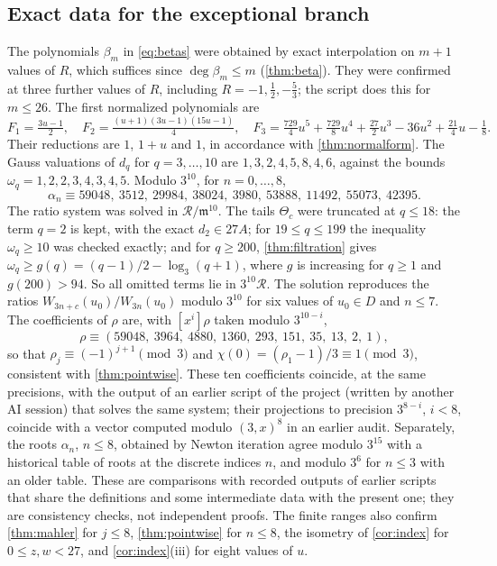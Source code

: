 \documentclass[11pt,reqno]{amsart}
\theoremstyle{definition}
\theoremstyle{remark}
\theoremstyle{plain}
\newcommand{\RR}{\mathscr R}
\newcommand{\mm}{\mathfrak m}
\begin{document}
\subsection{Exact data for the exceptional branch}
The polynomials $\beta_m$ in \eqref{eq:betas} were obtained by exact interpolation on $m+1$ values of $R$, which suffices since $\deg\beta_m\le m$ (\cref{thm:beta}). They were confirmed at three further values of $R$, including $R=-1,\tfrac12,-\tfrac53$; the script does this for $m\le26$. The first normalized polynomials are
\[
F_1=\tfrac{3u-1}2,\quad F_2=\tfrac{(u+1)(3u-1)(15u-1)}4,\quad F_3=\tfrac{729}{4}u^5+\tfrac{729}{8}u^4+\tfrac{27}{2}u^3-36u^2+\tfrac{21}4u-\tfrac18 .
\]
Their reductions are $1$, $1+u$ and $1$, in accordance with \cref{thm:normalform}. The Gauss valuations of $d_q$ for $q=3,\dots,10$ are $1,3,2,4,5,8,4,6$, against the bounds $\omega_q=1,2,2,3,4,3,4,5$. Modulo $3^{10}$, for $n=0,\dots,8$,
\[
\alpha_n\equiv59048,\ 3512,\ 29984,\ 38024,\ 3980,\ 53888,\ 11492,\ 55073,\ 42395 .
\]
The ratio system was solved in $\RR/\mm^{10}$. The tails $\Theta_c$ were truncated at $q\le18$: the term $q=2$ is kept, with the exact $d_2\in27A$; for $19\le q\le199$ the inequality $\omega_q\ge10$ was checked exactly; and for $q\ge200$, \cref{thm:filtration} gives $\omega_q\ge g(q)=(q-1)/2-\log_3(q+1)$, where $g$ is increasing for $q\ge1$ and $g(200)>94$. So all omitted terms lie in $3^{10}\RR$. The solution reproduces the ratios $W_{3n+c}(u_0)/W_{3n}(u_0)$ modulo $3^{10}$ for six values of $u_0\in D$ and $n\le7$. The coefficients of $\rho$ are, with $[x^i]\rho$ taken modulo $3^{10-i}$,
\[
\rho\equiv(59048,\ 3964,\ 4880,\ 1360,\ 293,\ 151,\ 35,\ 13,\ 2,\ 1),
\]
so that $\rho_j\equiv(-1)^{j+1}\pmod3$ and $\chi(0)=(\rho_1-1)/3\equiv1\pmod 3$, consistent with \cref{thm:pointwise}. These ten coefficients coincide, at the same precisions, with the output of an earlier script of the project (written by another AI session) that solves the same system; their projections to precision $3^{8-i}$, $i<8$, coincide with a vector computed modulo $(3,x)^8$ in an earlier audit. Separately, the roots $\alpha_n$, $n\le8$, obtained by Newton iteration agree modulo $3^{15}$ with a historical table of roots at the discrete indices $n$, and modulo $3^6$ for $n\le3$ with an older table. These are comparisons with recorded outputs of earlier scripts that share the definitions and some intermediate data with the present one; they are consistency checks, not independent proofs. The finite ranges also confirm \cref{thm:mahler} for $j\le8$, \cref{thm:pointwise} for $n\le8$, the isometry of \cref{cor:index} for $0\le z,w<27$, and \cref{cor:index}(iii) for eight values of $u$.
\end{document}

